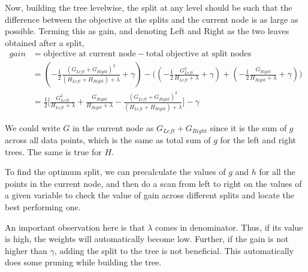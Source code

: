 \documentclass[../statistical_learning_notes.tex]{subfiles}
\begin{document}
Now, building the tree levelwise, the split at any level should be such that the difference between the objective at the splits and the current node is as large as possible. Terming this as gain, and denoting Left and Right as the two leaves obtained after a split,
\begin{align*}
    gain &= \text{objective at current node} - \text{total objective at split nodes}\\
    &= (-\frac{1}{2} \frac{(G_{Left} + G_{Right})^{2}}{(H_{Left} + H_{Right}) + \lambda} + \gamma) - \big( (-\frac{1}{2} \frac{G_{Left}^{2}}{H_{Left} + \lambda} + \gamma) + (-\frac{1}{2} \frac{G_{Right}}{H_{Right} + \lambda} + \gamma) \big)\\
    &= \frac{1}{2} \bigg[ \frac{G_{Left}^{2}}{H_{Left} + \lambda} + \frac{G_{Right}}{H_{Right} + \lambda} - \frac{(G_{Left} + G_{Right})^{2}}{(H_{Left} + H_{Right}) + \lambda} \bigg] -\gamma
\end{align*}

We could write $G$ in the current node as $G_{Left} + G_{Right}$ since it is the sum of $g$ across all data points, which is the same as total sum of $g$ for the left and right trees. The same is true for $H$.\newline

To find the optimum split, we can precalculate the values of $g$ and $h$ for all the points in the current node, and then do a scan from left to right on the values of a given variable to check the value of gain across different splits and locate the best performing one.\newline

An important observation here is that $\lambda$ comes in denominator. Thus, if its value is high, the weights will automatically become low. Further, if the gain is not higher than $\gamma$, adding the split to the tree is not beneficial. This automatically does some pruning while building the tree.
\end{document}
